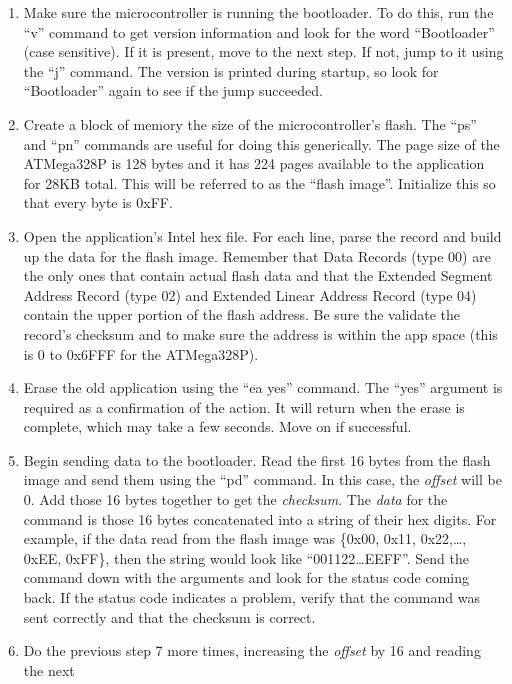 \documentclass{article}
\begin{document}
\begin{enumerate}
  \item Make sure the microcontroller is running the bootloader.  To do this, run the ``v'' command
    to get version information and look for the word ``Bootloader'' (case sensitive).  If it is
    present, move to the next step.  If not, jump to it using the ``j'' command.  The version is
    printed during startup, so look for ``Bootloader'' again to see if the jump succeeded.
  \item Create a block of memory the size of the microcontroller's flash.  The ``ps'' and ``pn''
    commands are useful for doing this generically.  The page size of the ATMega328P is 128 bytes
    and it has 224 pages available to the application for 28KB total.  This will be referred to as
    the ``flash image''.  Initialize this so that every byte is 0xFF.
  \item Open the application's Intel hex file.  For each line, parse the record and build up the
    data for the flash image.  Remember that Data Records (type 00) are the only ones that contain
    actual flash data and that the Extended Segment Address Record (type 02) and Extended Linear
    Address Record (type 04) contain the upper portion of the flash address.  Be sure the validate
    the record's checksum and to make sure the address is within the app space (this is 0 to 0x6FFF
    for the ATMega328P).
  \item Erase the old application using the ``ea yes'' command.  The ``yes'' argument is required as
    a confirmation of the action.  It will return when the erase is complete, which may take a few
    seconds.  Move on if successful.
  \item Begin sending data to the bootloader.  Read the first 16 bytes from the flash image and send
    them using the ``pd'' command.  In this case, the \emph{offset} will be 0.  Add those 16 bytes
    together to get the \emph{checksum}.  The \emph{data} for the command is those 16 bytes
    concatenated into a string of their hex digits.  For example, if the data read from the flash
    image was \{0x00, 0x11, 0x22,\ldots, 0xEE, 0xFF\}, then the string would look like
    ``001122\ldots EEFF''. Send the command down with the arguments and look for the status code coming
    back.  If the status code indicates a problem, verify that the command was sent correctly and
    that the checksum is correct.
  \item Do the previous step 7 more times, increasing the \emph{offset} by 16 and reading the next

\end{enumerate}
\end{document}
